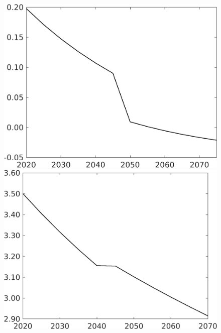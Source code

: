 \documentclass[12pt]{article}
\begin{document}
\begin{figure}[h!!]
\begin{minipage}[]{0.32\textwidth}
	\end{minipage}
	\begin{minipage}[]{0.32\textwidth}
		\includegraphics[width=1\textwidth]{../../codding_model/own_basedOnFried/optimalPol_010922_revision/figures/all_13Sept22/CompTaufPER_bytaul_Reg0_sn_spillover0_nsk0_xgr0_knspil1_sep1_LFlimit1_emsbase0_countec0_GovRev0_etaa0.79_lgd0.png}
	\end{minipage}		
	\begin{minipage}[]{0.32\textwidth}
		\includegraphics[width=1\textwidth]{../../codding_model/own_basedOnFried/optimalPol_010922_revision/figures/all_13Sept22/CompTaufPER_bytaul_Reg0_gAf_spillover0_nsk0_xgr0_knspil1_sep1_LFlimit1_emsbase0_countec0_GovRev0_etaa0.79_lgd0.png}

\end{minipage}
\end{figure}
\end{document}
